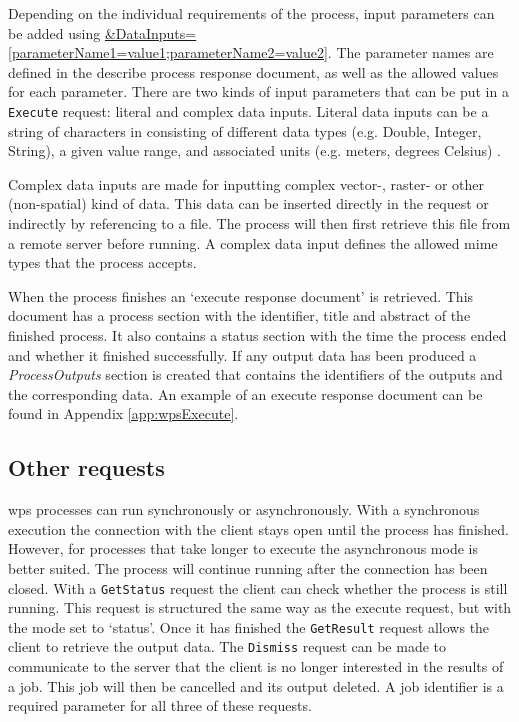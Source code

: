 \begin{sloppypar}
	Depending on the individual requirements of the process, input parameters can be added using \url{&DataInputs=[parameterName1=value1;parameterName2=value2]}. The parameter names are defined in the describe process response document, as well as the allowed values for each parameter. There are two kinds of input parameters that can be put in a \texttt{Execute} request: literal and complex data inputs. Literal data inputs can be a string of characters in consisting of different data types (e.g. Double, Integer, String), a given value range, and associated units (e.g. meters, degrees Celsius) \citep[p. 36]{GEO:OGC}. 
\end{sloppypar} 

Complex data inputs are made for inputting complex vector-, raster- or other (non-spatial) kind of data. This data can be inserted directly in the request or indirectly by referencing to a file. The process will then first retrieve this file from a remote server before running. A complex data input defines the allowed mime types that the process accepts.  

When the process finishes an `execute response document' is retrieved. This document has a process section with the identifier, title and abstract of the finished process. It also contains a status section with the time the process ended and whether it finished successfully. If any output data has been produced a \textit{ProcessOutputs} section is created that contains the identifiers of the outputs and the corresponding data. An example of an execute response document can be found in Appendix \ref{app:wpsExecute}.

\subsection{Other requests}
\begin{sloppypar}
	\ac{wps} processes can run synchronously or asynchronously. With a synchronous execution the connection with the client stays open until the process has finished. However, for processes that take longer to execute the asynchronous mode is better suited. The process will continue running after the connection has been closed. With a \texttt{GetStatus} request the client can check whether the process is still running. This request is structured the same way as the execute request, but with the mode set to `status'. Once it has finished the \texttt{GetResult} request allows the client to retrieve the output data. The \texttt{Dismiss} request can be made to communicate to the server that the client is no longer interested in the results of a job. This job will then be cancelled and its output deleted. A job identifier is a required parameter for all three of these requests.
\end{sloppypar}
 
